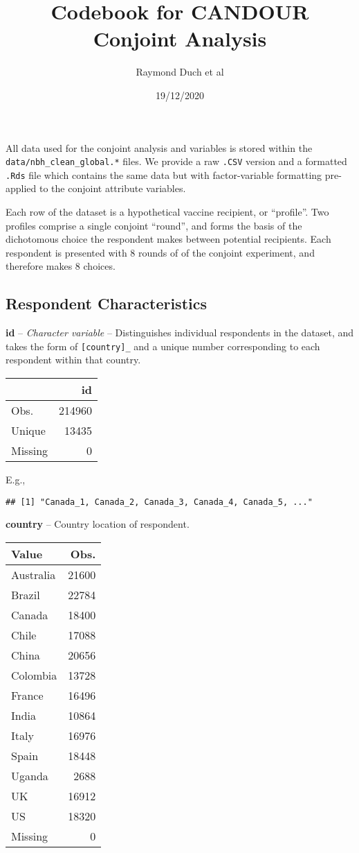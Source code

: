 \documentclass[
]{article}
\title{Codebook for CANDOUR Conjoint Analysis}
\author{Raymond Duch et al}
\date{19/12/2020}
\begin{document}
\maketitle

All data used for the conjoint analysis and variables is stored within
the \texttt{data/nbh\_clean\_global.*} files. We provide a raw
\texttt{.CSV} version and a formatted \texttt{.Rds} file which contains
the same data but with factor-variable formatting pre-applied to the
conjoint attribute variables.

Each row of the dataset is a hypothetical vaccine recipient, or
``profile''. Two profiles comprise a single conjoint ``round'', and
forms the basis of the dichotomous choice the respondent makes between
potential recipients. Each respondent is presented with 8 rounds of of
the conjoint experiment, and therefore makes 8 choices.

\hypertarget{respondent-characteristics}{%
\subsection{Respondent
Characteristics}\label{respondent-characteristics}}

\textbf{id} -- \emph{Character variable} -- Distinguishes individual
respondents in the dataset, and takes the form of
\texttt{{[}country{]}\_} and a unique number corresponding to each
respondent within that country.

\begin{longtable}[]{@{}lr@{}}
\toprule
& id\tabularnewline
\midrule
\endhead
Obs. & 214960\tabularnewline
Unique & 13435\tabularnewline
Missing & 0\tabularnewline
\bottomrule
\end{longtable}

E.g.,

\begin{verbatim}
## [1] "Canada_1, Canada_2, Canada_3, Canada_4, Canada_5, ..."
\end{verbatim}

\textbf{country} -- Country location of respondent.

\begin{longtable}[]{@{}lr@{}}
\toprule
Value & Obs.\tabularnewline
\midrule
\endhead
Australia & 21600\tabularnewline
Brazil & 22784\tabularnewline
Canada & 18400\tabularnewline
Chile & 17088\tabularnewline
China & 20656\tabularnewline
Colombia & 13728\tabularnewline
France & 16496\tabularnewline
India & 10864\tabularnewline
Italy & 16976\tabularnewline
Spain & 18448\tabularnewline
Uganda & 2688\tabularnewline
UK & 16912\tabularnewline
US & 18320\tabularnewline
Missing & 0\tabularnewline
\bottomrule
\end{longtable}
\end{document}

